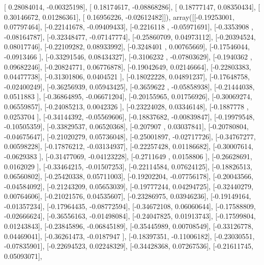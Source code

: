 \documentclass{article}
\begin{document}
       [ 0.28084014, -0.00325198],
       [ 0.18174617, -0.08868286],
       [ 0.18777147,  0.08350434],
       [ 0.30146672,  0.01286361],
       [ 0.16956226, -0.02612482]]), array([[-0.19253001,  0.07797464],
       [-0.22141678, -0.09409433],
       [-0.2216118 , -0.05971691],
       [-0.3353908 , -0.08164787],
       [-0.32348477, -0.07147774],
       [-0.25860709,  0.04973112],
       [-0.20394524,  0.08017746],
       [-0.22109282,  0.08933992],
       [-0.3248401 ,  0.00765669],
       [-0.17546044, -0.0913466 ],
       [-0.33291546,  0.08434327],
       [-0.3106232 , -0.07803629],
       [-0.1940362 ,  0.09682246],
       [-0.20824771,  0.06776878],
       [-0.19042649,  0.02146664],
       [-0.22803383,  0.04477738],
       [-0.31301806,  0.0404521 ],
       [-0.18022228,  0.04891237],
       [-0.17648758, -0.02400249],
       [-0.36256939,  0.05943425],
       [-0.3659622 , -0.05858938],
       [-0.21444038,  0.0511883 ],
       [-0.36864895, -0.06671204],
       [-0.20155965,  0.01756926],
       [-0.30069274,  0.06559857],
       [-0.24085213,  0.0042326 ],
       [-0.23224028,  0.03346148],
       [-0.1887778 ,  0.0253704 ],
       [-0.34144392, -0.05569606],
       [-0.18837682, -0.00839847],
       [-0.19979548, -0.10505359],
       [-0.33829537,  0.06520368],
       [-0.207907  ,  0.03037841],
       [-0.20780804, -0.04675647],
       [-0.21020279,  0.05736048],
       [-0.25001897, -0.02717726],
       [-0.34767277,  0.00598228],
       [-0.17876212, -0.03134937],
       [-0.22257428,  0.01186682],
       [-0.30007614, -0.0629383 ],
       [-0.31477069, -0.04123228],
       [-0.2711649 ,  0.0158806 ],
       [-0.26628691,  0.0162029 ],
       [-0.33464215, -0.01507253],
       [-0.22114584,  0.07624125],
       [-0.18826513,  0.06560802],
       [-0.25420338,  0.05711003],
       [-0.19202204, -0.07756178],
       [-0.20043566, -0.04584092],
       [-0.21243209,  0.05653039],
       [-0.19777244,  0.04294725],
       [-0.32440279,  0.00764606],
       [-0.21021576,  0.04535607],
       [-0.23286975,  0.03946236],
       [-0.19149164, -0.01357234],
       [-0.17964435, -0.08772594],
       [-0.34672108,  0.06060644],
       [-0.17588809, -0.02666624],
       [-0.36556163, -0.01498084],
       [-0.24047825,  0.01913743],
       [-0.17599804,  0.01243843],
       [-0.23845896, -0.06845189],
       [-0.35445989,  0.00708549],
       [-0.33126778,  0.04469041],
       [-0.36261473, -0.0187947 ],
       [-0.18397351, -0.11006182],
       [-0.23030551, -0.07835901],
       [-0.22694523,  0.02248329],
       [-0.34428368,  0.07267536],
       [-0.21611745,  0.05093071],
\end{document}
